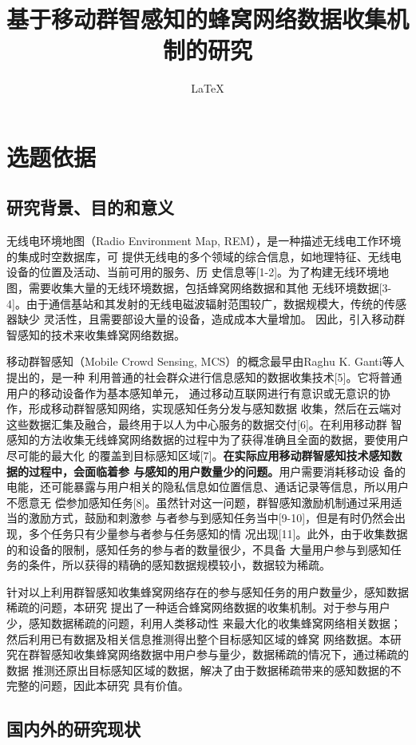 \documentclass[UTF8]{ctexart}
\title{基于移动群智感知的蜂窝网络数据收集机制的研究}
\author{\LaTeX}
\begin{document}
\maketitle
\section{选题依据}
\subsection{研究背景、目的和意义}
无线电环境地图（Radio Environment Map, REM），是一种描述无线电工作环境的集成时空数据库，可
提供无线电的多个领域的综合信息，如地理特征、无线电设备的位置及活动、当前可用的服务、历
史信息等[1-2]。为了构建无线环境地图，需要收集大量的无线环境数据，包括蜂窝网络数据和其他
无线环境数据[3-4]。由于通信基站和其发射的无线电磁波辐射范围较广，数据规模大，传统的传感器缺少
灵活性，且需要部设大量的设备，造成成本大量增加。
因此，引入移动群智感知的技术来收集蜂窝网络数据。

移动群智感知（Mobile Crowd Sensing, MCS）的概念最早由Raghu K. Ganti等人提出的，是一种
利用普通的社会群众进行信息感知的数据收集技术[5]。它将普通用户的移动设备作为基本感知单元，
通过移动互联网进行有意识或无意识的协作，形成移动群智感知网络，实现感知任务分发与感知数据
收集，然后在云端对这些数据汇集及融合，最终用于以人为中心服务的数据交付[6]。在利用移动群
智感知的方法收集无线蜂窝网络数据的过程中为了获得准确且全面的数据，要使用户尽可能的最大化
的覆盖到目标感知区域[7]。\textbf{在实际应用移动群智感知技术感知数据的过程中，会面临着参
与感知的用户数量少的问题。}用户需要消耗移动设
备的电能，还可能暴露与用户相关的隐私信息如位置信息、通话记录等信息，所以用户不愿意无
偿参加感知任务[8]。虽然针对这一问题，群智感知激励机制通过采用适当的激励方式，鼓励和刺激参
与者参与到感知任务当中[9-10]，但是有时仍然会出现，多个任务只有少量参与者参与任务感知的情
况出现[11]。此外，由于收集数据的和设备的限制，感知任务的参与者的数量很少，不具备
大量用户参与到感知任务的条件，所以获得的精确的感知数据规模较小，数据较为稀疏。

针对以上利用群智感知收集蜂窝网络存在的参与感知任务的用户数量少，感知数据稀疏的问题，本研究
提出了一种适合蜂窝网络数据的收集机制。对于参与用户少，感知数据稀疏的问题，利用人类移动性
来最大化的收集蜂窝网络相关数据；然后利用已有数据及相关信息推测得出整个目标感知区域的蜂窝
网络数据。本研究在群智感知收集蜂窝网络数据中用户参与量少，数据稀疏的情况下，通过稀疏的数据
推测还原出目标感知区域的数据，解决了由于数据稀疏带来的感知数据的不完整的问题，因此本研究
具有价值。

\subsection{国内外的研究现状}
\end{document}
